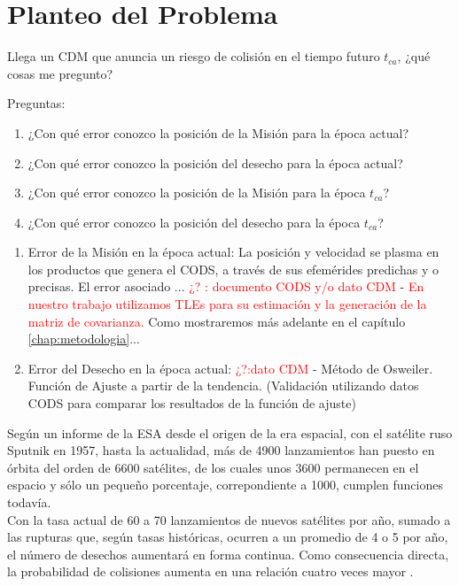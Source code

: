 \section{Planteo del Problema}
Llega un CDM que anuncia un riesgo de colisi\'on en el tiempo futuro $t_{ca}$, ¿qu\'e cosas me pregunto?

Preguntas:\\

\begin{enumerate}
 \item ¿Con qu\'e error conozco la posici\'on de la Misi\'on para la \'epoca actual?\\
 \item ¿Con qu\'e error conozco la posici\'on del desecho para la \'epoca actual?\\
 \item ¿Con qu\'e error conozco la posici\'on de la Misi\'on para la \'epoca $t_{ca}$?\\
 \item ¿Con qu\'e error conozco la posici\'on del desecho para la \'epoca $t_{ca}$?\\
\end{enumerate}

\begin{enumerate}
 \item Error de la Misi\'on en la \'epoca actual: La posici\'on y velocidad se plasma en los productos que genera el CODS, a trav\'es de sus efem\'erides predichas y o precisas. El error asociado ... {\textcolor{red}{¿? : documento CODS y/o dato CDM}} - {\textcolor{red}{En nuestro trabajo utilizamos TLEs para su estimaci\'on y la generaci\'on de la matriz de covarianza.}} Como mostraremos m\'as adelante en el capítulo \ref{chap:metodologia}...\\
 \item Error del Desecho en la \'epoca actual: {\textcolor{red}{¿?:dato CDM}} - M\'etodo de Osweiler. Funci\'on de Ajuste a partir de la tendencia. (Validaci\'on utilizando datos CODS para comparar los resultados de la funci\'on de ajuste)
 
\end{enumerate}
Seg\'un un informe de la \ac{ESA} desde el origen de la era espacial, con el sat\'elite ruso Sputnik en 1957, hasta la actualidad, m\'as de 4900 lanzamientos han puesto en \'orbita del orden de 6600 sat\'elites, de los cuales unos 3600 permanecen en el espacio y s\'olo un peque\~no porcentaje, correpondiente a 1000, cumplen funciones todav\'ia.\\
	Con la tasa actual de 60 a 70 lanzamientos de nuevos sat\'elites por a\~no, sumado a las rupturas que, seg\'un tasas hist\'oricas, ocurren a un promedio de 4 o 5 por a\~no, el n\'umero de desechos aumentar\'a en forma continua. Como consecuencia directa, la probabilidad de colisiones aumenta en una relaci\'on cuatro veces mayor \cite{esaSD}.\\




